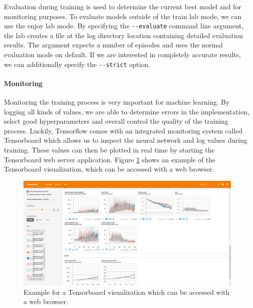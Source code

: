 Evaluation during training is used to determine the current best model and for monitoring purposes. To evaluate models outside of the train lab mode, we can use the enjoy lab mode. By specifying the \texttt{-{}-evaluate} command line argument, the lab creates a file at the log directory location containing detailed evaluation results. The argument expects a number of episodes and uses the normal evaluation mode on default. If we are interested in completely accurate results, we can additionally specify the \texttt{-{}-strict} option. 

\paragraph{Monitoring}
Monitoring the training process is very important for machine learning. By logging all kinds of values, we are able to determine errors in the implementation, select good hyperparameters and overall control the quality of the training process. Luckily, Tensorflow comes with an integrated monitoring system called Tensorboard which allows us to inspect the neural network and log values during training. These values can then be plotted in real time by starting the Tensorboard web server application. Figure \ref{fig:TensorboardExample} shows an example of the Tensorboard visualization, which can be accessed with a web browser.

\begin{figure}[ht]
    
    \begin{center}
        \includegraphics[clip, width=0.95\columnwidth]{figures/implementation/Tensorboard.png}
    \end{center}
    
    \caption[Tensorboard Example]{Example for a Tensorboard visualization which can be accessed with a web browser.}
    \label{fig:TensorboardExample}
  \end{figure}

